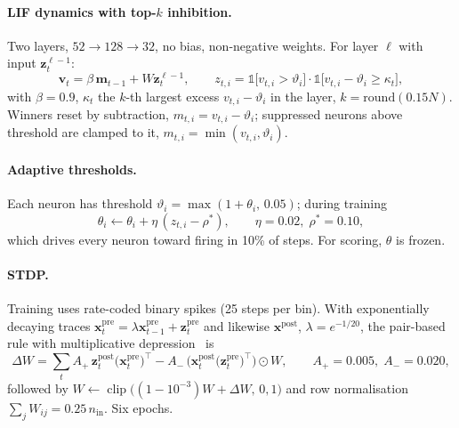 \documentclass[10pt]{article}
\newcommand{\clip}{\operatorname{clip}}
\begin{document}
\paragraph{LIF dynamics with top-$k$ inhibition.} Two layers, $52\to128\to32$, no bias, non-negative weights. For layer $\ell$ with input $\mathbf{z}^{\ell-1}_t$:
\begin{equation}
  \mathbf{v}_t = \beta\,\mathbf{m}_{t-1} + W\mathbf{z}^{\ell-1}_t, \qquad
  z_{t,i} = \mathbb{1}\big[v_{t,i} > \vartheta_i\big]\cdot\mathbb{1}\big[v_{t,i}-\vartheta_i \ge \kappa_t\big],
  \label{eq:lif}
\end{equation}
with $\beta=0.9$, $\kappa_t$ the $k$-th largest excess $v_{t,i}-\vartheta_i$ in the layer, $k=\mathrm{round}(0.15N)$. Winners reset by subtraction, $m_{t,i}=v_{t,i}-\vartheta_i$; suppressed neurons above threshold are clamped to it, $m_{t,i}=\min(v_{t,i},\vartheta_i)$.

\paragraph{Adaptive thresholds.} Each neuron has threshold $\vartheta_i = \max(1+\theta_i,\, 0.05)$; during training
\begin{equation}
  \theta_i \leftarrow \theta_i + \eta\,(z_{t,i} - \rho^\ast), \qquad \eta = 0.02,\; \rho^\ast = 0.10,
  \label{eq:homeo}
\end{equation}
which drives every neuron toward firing in 10\% of steps. For scoring, $\theta$ is frozen.

\paragraph{STDP.} Training uses rate-coded binary spikes (25 steps per bin). With exponentially decaying traces $\mathbf{x}^{\mathrm{pre}}_t = \lambda\mathbf{x}^{\mathrm{pre}}_{t-1}+\mathbf{z}^{\mathrm{pre}}_t$ and likewise $\mathbf{x}^{\mathrm{post}}$, $\lambda=e^{-1/20}$, the pair-based rule with multiplicative depression~\cite{bi1998stdp,diehl2015unsupervised} is
\begin{equation}
  \Delta W = \sum_t A_{+}\, \mathbf{z}^{\mathrm{post}}_t \big(\mathbf{x}^{\mathrm{pre}}_t\big)^{\!\top} - A_{-}\, \big(\mathbf{x}^{\mathrm{post}}_t \big(\mathbf{z}^{\mathrm{pre}}_t\big)^{\!\top}\big)\odot W,
  \qquad A_{+}=0.005,\; A_{-}=0.020,
  \label{eq:stdp}
\end{equation}
followed by $W\leftarrow\clip\big((1-10^{-3})W+\Delta W,\,0,1\big)$ and row normalisation $\sum_j W_{ij} = 0.25\,n_{\mathrm{in}}$. Six epochs.
\end{document}
